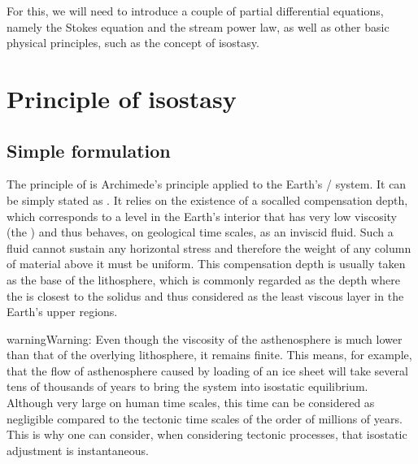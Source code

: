 \documentclass[letterpaper,10pt,english]{jupyterBook}
\begin{document}
\sphinxAtStartPar
For this, we will need to introduce a couple of partial differential equations, namely the Stokes equation and the stream power law, as well as other basic physical principles, such as the concept of isostasy.

\sphinxstepscope


\section{Principle of isostasy}
\label{\detokenize{isostasy:principle-of-isostasy}}\label{\detokenize{isostasy::doc}}

\subsection{Simple formulation}
\label{\detokenize{isostasy:simple-formulation}}
\sphinxAtStartPar
The principle of {\hyperref[\detokenize{glossary:term-Isostasy}]{}} is Archimede’s principle applied to the Earth’s {\hyperref[\detokenize{glossary:term-Lithosphere}]{}}/{\hyperref[\detokenize{glossary:term-Asthenosphere}]{}} system. It can be simply stated as . It relies on the existence of a so\sphinxhyphen{}called compensation depth, which corresponds to a level in the Earth’s interior that has very low viscosity (the {\hyperref[\detokenize{glossary:term-Asthenosphere}]{}}) and thus behaves, on geological time scales, as an inviscid fluid. Such a fluid cannot sustain any horizontal stress and therefore the weight of any column of material above it must be uniform. This compensation depth is usually taken as the base of the lithosphere, which is commonly regarded as the depth where the {\hyperref[\detokenize{glossary:term-Geotherm}]{}} is closest to the solidus and thus considered as the least viscous layer in the Earth’s upper regions.

\begin{sphinxadmonition}{warning}{Warning:}
\sphinxAtStartPar
Even though the viscosity of the asthenosphere is much lower than that of the overlying lithosphere, it remains finite. This means, for example, that the flow of asthenosphere caused by loading of an ice sheet will take several tens of thousands of years to bring the system into isostatic equilibrium. Although very large on human time scales, this time can be considered as negligible compared to the tectonic time scales of the order of millions of years. This is why one can consider, when considering tectonic processes, that isostatic adjustment is instantaneous.
\end{sphinxadmonition}
\end{document}
